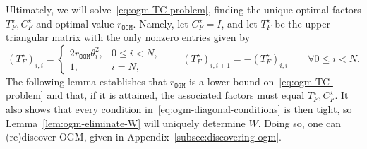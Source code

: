\documentclass[11pt]{article}
\begin{document}
Ultimately, we will solve~\eqref{eq:ogm-TC-problem}, finding the unique
optimal factors $T_F^\star,C_F^\star$ and optimal value
$r_\mathtt{OGM}$. Namely, let $C_F^\star=I$, and let $T_F^\star$ be the upper
triangular matrix with the only nonzero entries given by
\begin{equation}\label{eq:ogm-T-star-r}
    (T_F^\star)_{i,i}=
    \begin{cases}
        2r_\mathtt{OGM}\theta_i^2,&0\leq i<N,\\
        1,&i=N,
    \end{cases}
    \qquad
    (T_F^\star)_{i,i+1}=-(T_F^\star)_{i,i}
    \qquad \forall 0\leq i<N.
\end{equation}
The following lemma establishes that $r_\mathtt{OGM}$ is a lower bound
on~\eqref{eq:ogm-TC-problem} and that, if it is attained, the associated
factors must equal $T_F^\star,C_F^\star$. It also shows that every condition
in~\eqref{eq:ogm-diagonal-conditions} is then tight, so
Lemma~\ref{lem:ogm-eliminate-W} will uniquely determine $W$. Doing so, one can (re)discover OGM, given in Appendix~\ref{subsec:discovering-ogm}.
\end{document}
